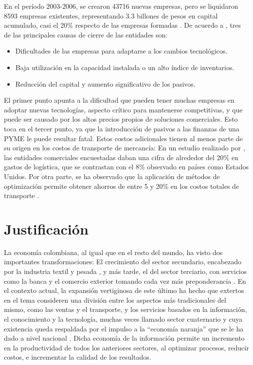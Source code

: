 \documentclass[12pt]{extarticle}
\begin{document}
En el período 2003-2006, se crearon 43716 nuevas empresas, pero se liquidaron
8593 empresas existentes, representando 3.3 billones de pesos en capital
acumulado, casi el 20\% respecto de las empresas formadas
\cite{espinosa_fracaso_2015}\cite[págs. 14-21]{bogota_dinamica_2006}. De acuerdo
a \cite[págs. 13-14]{vega_pymes_2011}\cite[págs. 23-24]{bogota_dinamica_2006}, tres de las principales
causas de cierre de las entidades son:
\begin{itemize}
\item Dificultades de las empresas para adaptarse a los cambios tecnológicos.
\item Baja utilización en la capacidad instalada o un alto índice de
  inventarios.
\item Reducción del capital y aumento significativo de los pasivos.
\end{itemize}
El primer punto apunta a la dificultad que pueden tener muchas empresas en
adoptar nuevas tecnologías, aspecto crítico para mantenerse competitivas, y que
puede ser causado por los altos precios propios de soluciones comerciales. Esto
toca en el tercer punto, ya que la introducción de pasivos a las finanzas de una
PYME le puede resultar fatal. Estos costos adicionales tienen al menos parte de
su origen en los costos de transporte de mercancía: En un estudio realizado por
\cite[pág. 6]{gaytan_logistica_2017}, las entidades comerciales encuestadas
daban una cifra de alrededor del 20\% en gastos de logística, que se contrastan
con el 8\% observado en países como Estados Unidos. Por otra parte, se ha
observado que la aplicación de métodos de optimización permite obtener ahorros
de entre 5 y 20\% en los costos totales de transporte
\cite{toth_paolo_vehicle_2002}.


\section{Justificación}
La economía colombiana, al igual que en el resto del mundo, ha visto dos
importantes transformaciones: El crecimiento del sector secundario, encabezado
por la industria textil y pesada \cite{naranjo_industria_nodate}, y más tarde,
el del sector terciario, con servicios como la banca y el comercio exterior
tomando cada vez más preponderancia \cite{urrutia_perspectivas_1990} . En el
contexto actual, la expansión vertiginosa de este último ha hecho que extertos
en el tema consideren una división entre los aspectos más tradicionales del
mismo, como las ventas y el transporte, y los servicios basados en la
información, el conocimiento y la tecnología, muchas veces llamado sector
cuaternario y cuya existencia queda respaldada por el impulso a la ``economía
naranja'' que se le ha dado a nivel nacional
\cite{noauthor_econominaranja_nodate}. Dicha economía de la información permite
un incremento en la productividad de todos los anteriores sectores, al optimizar
procesos, reducir costos, e incrementar la calidad de los resultados.
\end{document}
